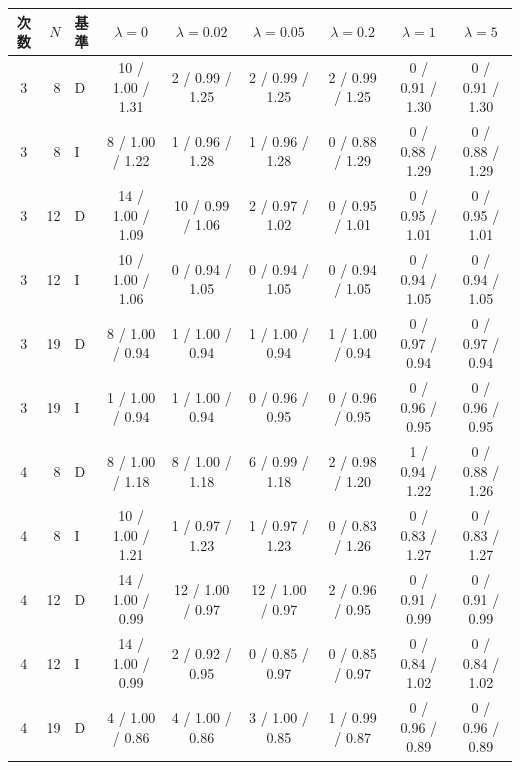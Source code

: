 
\begin{tabular}{crlcccccc}
\toprule
次数 & $N$ & 基準 & $\lambda=0$ & $\lambda=0.02$ & $\lambda=0.05$ & $\lambda=0.2$ & $\lambda=1$ & $\lambda=5$ \\
\midrule
3 & 8 & D & 10 / 1.00 / 1.31 & 2 / 0.99 / 1.25 & 2 / 0.99 / 1.25 & 2 / 0.99 / 1.25 & 0 / 0.91 / 1.30 & 0 / 0.91 / 1.30 \\
3 & 8 & I & 8 / 1.00 / 1.22 & 1 / 0.96 / 1.28 & 1 / 0.96 / 1.28 & 0 / 0.88 / 1.29 & 0 / 0.88 / 1.29 & 0 / 0.88 / 1.29 \\
3 & 12 & D & 14 / 1.00 / 1.09 & 10 / 0.99 / 1.06 & 2 / 0.97 / 1.02 & 0 / 0.95 / 1.01 & 0 / 0.95 / 1.01 & 0 / 0.95 / 1.01 \\
3 & 12 & I & 10 / 1.00 / 1.06 & 0 / 0.94 / 1.05 & 0 / 0.94 / 1.05 & 0 / 0.94 / 1.05 & 0 / 0.94 / 1.05 & 0 / 0.94 / 1.05 \\
3 & 19 & D & 8 / 1.00 / 0.94 & 1 / 1.00 / 0.94 & 1 / 1.00 / 0.94 & 1 / 1.00 / 0.94 & 0 / 0.97 / 0.94 & 0 / 0.97 / 0.94 \\
3 & 19 & I & 1 / 1.00 / 0.94 & 1 / 1.00 / 0.94 & 0 / 0.96 / 0.95 & 0 / 0.96 / 0.95 & 0 / 0.96 / 0.95 & 0 / 0.96 / 0.95 \\
\midrule
4 & 8 & D & 8 / 1.00 / 1.18 & 8 / 1.00 / 1.18 & 6 / 0.99 / 1.18 & 2 / 0.98 / 1.20 & 1 / 0.94 / 1.22 & 0 / 0.88 / 1.26 \\
4 & 8 & I & 10 / 1.00 / 1.21 & 1 / 0.97 / 1.23 & 1 / 0.97 / 1.23 & 0 / 0.83 / 1.26 & 0 / 0.83 / 1.27 & 0 / 0.83 / 1.27 \\
4 & 12 & D & 14 / 1.00 / 0.99 & 12 / 1.00 / 0.97 & 12 / 1.00 / 0.97 & 2 / 0.96 / 0.95 & 0 / 0.91 / 0.99 & 0 / 0.91 / 0.99 \\
4 & 12 & I & 14 / 1.00 / 0.99 & 2 / 0.92 / 0.95 & 0 / 0.85 / 0.97 & 0 / 0.85 / 0.97 & 0 / 0.84 / 1.02 & 0 / 0.84 / 1.02 \\
4 & 19 & D & 4 / 1.00 / 0.86 & 4 / 1.00 / 0.86 & 3 / 1.00 / 0.85 & 1 / 0.99 / 0.87 & 0 / 0.96 / 0.89 & 0 / 0.96 / 0.89 \\

\end{tabular}
